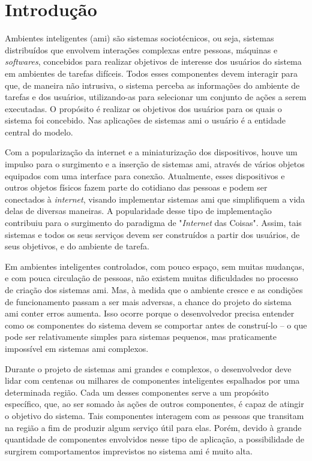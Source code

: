 \chapter{Introdução}
\label{cap:introducao}
    
    Ambientes inteligentes (\acrshort{ami}) são sistemas sociotécnicos, ou seja, sistemas distribuídos que envolvem interações complexas entre pessoas, máquinas e \textit{softwares}, concebidos para realizar objetivos de interesse dos usuários do sistema em ambientes de tarefas difíceis. Todos esses componentes devem interagir para que, de maneira não intrusiva, o sistema perceba as informações do ambiente de tarefas e dos usuários, utilizando-as para selecionar um conjunto de ações a serem executadas. O propósito é realizar os objetivos dos usuários para os quais o sistema foi concebido. Nas aplicações de sistemas \acrshort{ami} o usuário é a entidade central do modelo. 
   
    Com a popularização da internet e a miniaturização dos dispositivos, houve um impulso para o surgimento e a inserção de sistemas \acrshort{ami}, através de vários objetos equipados com uma interface para conexão. Atualmente, esses dispositivos e outros objetos físicos fazem parte do cotidiano das pessoas e podem ser conectados à \textit{internet}, visando implementar sistemas \acrshort{ami} que simplifiquem a vida delas de diversas maneiras. A popularidade desse tipo de implementação contribuiu para o surgimento do paradigma de "\textit{Internet} das Coisas". Assim, tais sistemas e todos os seus serviços devem ser construídos a partir dos usuários, de seus objetivos, e do ambiente de tarefa.
    
    Em ambientes inteligentes controlados, com pouco espaço, sem muitas mudanças, e com pouca circulação de pessoas, não existem muitas dificuldades no processo de criação dos sistemas \acrshort{ami}. Mas, à medida que o ambiente cresce e as condições de funcionamento passam a ser mais adversas, a chance do projeto do sistema \acrshort{ami} conter erros aumenta. Isso ocorre porque o desenvolvedor precisa entender como os componentes do sistema devem se comportar antes de construí-lo -- o que pode ser relativamente simples para sistemas pequenos, mas praticamente impossível em sistemas \acrshort{ami} complexos. 
    
    Durante o projeto de sistemas \acrshort{ami} grandes e complexos, o desenvolvedor deve lidar com centenas ou milhares de componentes inteligentes espalhados por uma determinada região. Cada um  desses componentes serve a um propósito específico, que, ao ser somado às ações de outros componentes, é capaz de atingir o objetivo do sistema. Tais componentes interagem com as pessoas que transitam na região a fim de produzir algum serviço útil para elas. Porém, devido à grande quantidade de componentes envolvidos nesse tipo de aplicação, a possibilidade de surgirem comportamentos imprevistos no sistema \acrshort{ami} é muito alta. 
    
